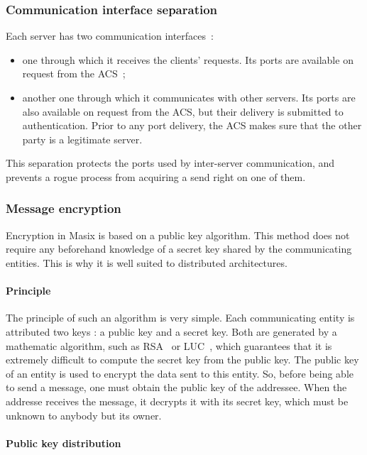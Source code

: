 \subsubsection{Communication interface separation}

Each server has two communication interfaces~:
\begin{itemize}
\item one through which it receives the clients' requests. Its ports are 
available on request from the ACS~;
\item another one through which it communicates with other servers. Its ports 
are also available on request from the ACS, but their delivery is
submitted to authentication. Prior to any port delivery, the ACS 
makes sure that the other party is a legitimate server.
\end{itemize}

This separation protects the ports used by inter-server communication, and
prevents a rogue process from acquiring a send right on one of them.

\subsubsection{Message encryption}

Encryption in Masix is based on a public key algorithm. This method 
does not require any beforehand knowledge of a secret key shared by 
the communicating entities. This is why it is well suited to distributed 
architectures.

\paragraph{Principle}

The principle of such an algorithm is very simple. Each communicating entity 
is attributed two keys : a public key and a secret key. Both are 
generated by a mathematic algorithm, such as RSA~\cite{Rivest78} or 
LUC~\cite{Smith92}, which guarantees that it is extremely difficult to compute 
the secret key from the public key.
The public key of an entity is used to encrypt the data sent to this entity.
So, before being able to send a message, one must obtain the public key of 
the addressee. 
When the addresse receives the message, it decrypts it with its secret key,
which must be unknown to anybody but its owner.

\paragraph{Public key distribution}

